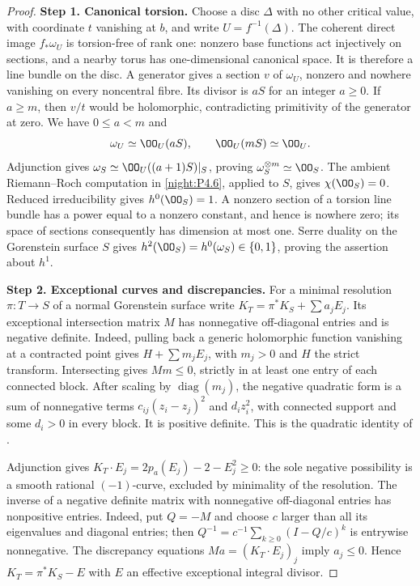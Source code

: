 \begin{proof}
\noindent\textbf{Step 1. Canonical torsion.}
Choose a disc $\Delta$ with no other critical value, with coordinate
$t$ vanishing at $b$, and write $U=f^{-1}(\Delta)$. The coherent
direct image $f_*\omega_U$ is torsion-free of rank one: nonzero
base functions act injectively on sections, and a nearby torus has
one-dimensional canonical space. It is therefore a line bundle
on the disc. A generator gives a section $v$ of $\omega_U$,
nonzero and nowhere vanishing on every noncentral fibre. Its
divisor is $aS$ for an integer $a\ge0$. If $a\ge m$, then $v/t$
would be holomorphic, contradicting primitivity of the generator
at zero. We have $0\le a<m$ and
\[
 \omega_U\simeq\OO_U(aS),\qquad\OO_U(mS)\simeq\OO_U.
\]
Adjunction gives $\omega_S\simeq\OO_U((a+1)S)|_S$, proving
$\omega_S^{\otimes m}\simeq\OO_S$. The ambient
Riemann--Roch computation in \ref{night:P4.6}, applied to $S$, gives
$\chi(\OO_S)=0$. Reduced irreducibility gives $h^0(\OO_S)=1$.
A nonzero section of a torsion line bundle has a power equal to
a nonzero constant, and hence is nowhere zero; its space of
sections consequently has dimension at most one. Serre duality
on the Gorenstein surface $S$ gives
$h^2(\OO_S)=h^0(\omega_S)\in\{0,1\}$, proving the assertion
about $h^1$.

\noindent\textbf{Step 2. Exceptional curves and discrepancies.}
For a minimal resolution $\pi:T\to S$ of a normal Gorenstein
surface write $K_T=\pi^*K_S+\sum a_jE_j$. Its exceptional
intersection matrix $M$ has nonnegative off-diagonal entries
and is negative definite. Indeed,
pulling back a generic holomorphic function vanishing at a
contracted point gives $H+\sum m_jE_j$, with $m_j>0$ and $H$
the strict transform. Intersecting gives $Mm\le0$, strictly in
at least one entry of each connected block. After scaling by
$\operatorname{diag}(m_j)$, the negative quadratic form is a
sum of nonnegative terms $c_{ij}(z_i-z_j)^2$ and $d_i z_i^2$,
with connected support and some $d_i>0$ in every block. It is
positive definite. This is the quadratic identity of
\cite[\S I, unnumbered assertion and proof, p.~6]{Mumford1961}.

Adjunction gives
$K_T\cdot E_j=2p_a(E_j)-2-E_j^2\ge0$: the sole negative
possibility is a smooth rational $(-1)$-curve, excluded by
minimality of the resolution. The inverse of a negative definite
matrix with nonnegative off-diagonal entries has nonpositive
entries. Indeed, put $Q=-M$ and choose $c$ larger than all its
eigenvalues and diagonal entries; then
$Q^{-1}=c^{-1}\sum_{k\ge0}(I-Q/c)^k$ is entrywise nonnegative.
The discrepancy equations $Ma=(K_T\cdot E_j)_j$ imply
$a_j\le0$. Hence $K_T=\pi^*K_S-E$ with $E$ an effective
exceptional integral divisor.


\end{proof}
